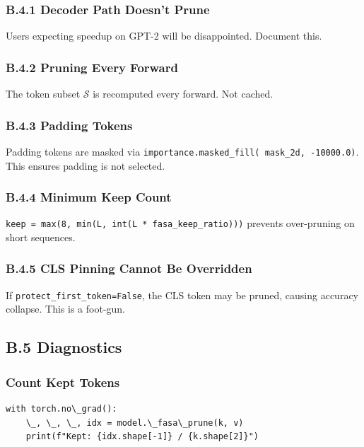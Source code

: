 \subsubsection{B.4.1 Decoder Path Doesn't Prune}

Users expecting speedup on GPT-2 will be disappointed. Document this.

\subsubsection{B.4.2 Pruning Every Forward}

The token subset $\mathcal{S}$ is recomputed every forward. Not cached.

\subsubsection{B.4.3 Padding Tokens}

Padding tokens are masked via \texttt{importance.masked\_fill(~mask\_2d, -10000.0)}. 
This ensures padding is not selected.

\subsubsection{B.4.4 Minimum Keep Count}

\texttt{keep = max(8, min(L, int(L * fasa\_keep\_ratio)))} prevents over-pruning on 
short sequences.

\subsubsection{B.4.5 CLS Pinning Cannot Be Overridden}

If \texttt{protect\_first\_token=False}, the CLS token may be pruned, causing 
accuracy collapse. This is a foot-gun.

\subsection{B.5 Diagnostics}

\subsubsection{Count Kept Tokens}

\begin{lstlisting}
with torch.no\_grad():
    \_, \_, \_, idx = model.\_fasa\_prune(k, v)
    print(f"Kept: {idx.shape[-1]} / {k.shape[2]}")
\end{lstlisting}

